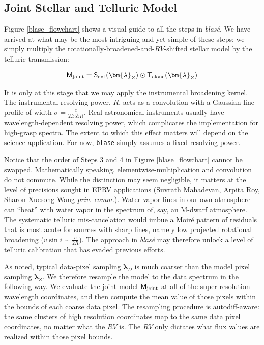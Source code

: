 \documentclass[trackchanges]{aastex631}
\begin{document}
\subsection{Joint Stellar and Telluric Model}
Figure \ref{blase_flowchart} shows a visual guide to all the steps in  \emph{blas\'e}.  We have arrived at what may be the most intriguing-and-yet-simple of these steps: we simply multiply the rotationally-broadened-and-$RV$-shifted stellar model by the telluric transmission:

\begin{eqnarray}
    \mathsf{M}_{\rm joint} = \mathsf{S}_{\rm ext}(\bm{\lambda}_Z) \odot \mathsf{T}_{\rm clone}(\bm{\lambda}_Z)
\end{eqnarray}

It is only at this stage that we may apply the instrumental broadening kernel.  The instrumental resolving power, $R$, acts as a convolution with a Gaussian line profile of width $\sigma=\frac{c}{2.355 R}$.  Real astronomical instruments usually have wavelength-dependent resolving power, which complicates the implementation for high-grasp spectra.  The extent to which this effect matters will depend on the science application.  For now, \texttt{blase} simply assumes a fixed resolving power.

Notice that the order of Steps 3 and 4 in Figure \ref{blase_flowchart} cannot be swapped.  Mathematically speaking, elementwise-multiplication and convolution do not commute.  While the distinction may seem negligible, it matters at the level of precisions sought in EPRV applications (Suvrath Mahadevan, Arpita Roy, Sharon Xuesong Wang \emph{priv. comm.}).  Water vapor lines in our own atmosphere can ``beat'' with water vapor in the spectrum of, say, an M-dwarf atmosphere.  The systematic telluric mis-cancelation would imbue a Moir\'e pattern of residuals that is most acute for sources with sharp lines, namely low projected rotational broadening ($v\sin{i}\sim\frac{c}{2R}$).  The approach in \emph{blas\'e} may therefore unlock a level of telluric calibration that has evaded previous efforts.

As noted, typical data-pixel sampling $\bm{\lambda}_D$ is much coarser than the model pixel sampling $\bm{\lambda}_Z$.  We therefore resample the model to the data spectrum in the following way.  We evaluate the joint model $\mathsf{M}_{\rm joint}$ at all of the super-resolution wavelength coordinates, and then compute the mean value of those pixels within the bounds of each coarse data pixel.  The resampling procedure is autodiff-aware: the same clusters of high resolution coordinates map to the same data pixel coordinates, no matter what the $RV$ is.  The $RV$ only dictates what flux values are realized within those pixel bounds.
\end{document}
